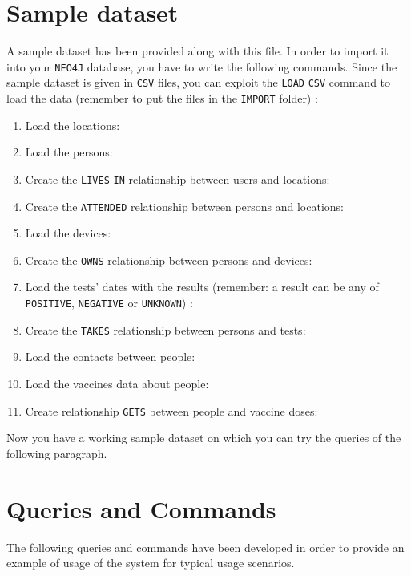 \documentclass{article}
\begin{document}
\section{Sample dataset}
A sample dataset has been provided along with this file. In order to import it into your \verb |NEO4J| database, you have to write the following commands.
Since the sample dataset is given in \verb |CSV| files, you can exploit the \verb |LOAD| \verb |CSV| command to load the data (remember to put the files in the \verb |IMPORT| folder) :
\begin{enumerate}
    \item Load the locations: 
    \item Load the persons: 
    \item Create the \verb |LIVES| \verb |IN| relationship between users and locations:
    \item Create the \verb |ATTENDED| relationship between persons and locations:
    \item Load the devices: 
    \item Create the \verb |OWNS| relationship between persons and devices:
    \item Load the tests' dates with the results (remember: a result can be any of \verb |POSITIVE|, \verb |NEGATIVE| or \verb |UNKNOWN|) :
    \item Create the \verb |TAKES| relationship between persons and tests:
    \item Load the contacts between people: 
    \item Load the vaccines data about people:
    \item Create relationship \verb |GETS| between people and vaccine doses: 
\end{enumerate}
Now you have a working sample dataset on which you can try the queries of the following paragraph.
\section{Queries and Commands}
The following queries and commands have been developed in order to provide an example of usage of the system for typical usage scenarios.
\end{document}
